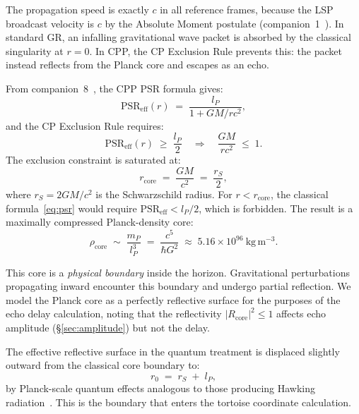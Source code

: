 \documentclass[12pt]{article}
\newcommand{\lP}{l_P}
\newcommand{\mP}{m_P}
\newcommand{\rS}{r_S}
\newcommand{\rcore}{r_{\mathrm{core}}}
\newcommand{\PSR}{\mathrm{PSR}}
\begin{document}
The propagation speed is exactly $c$ in all reference frames, because
the LSP broadcast velocity is $c$ by the Absolute Moment postulate
(companion~1~\cite{c1}).  In standard GR, an infalling gravitational
wave packet is absorbed by the classical singularity at $r = 0$.
In CPP, the CP Exclusion Rule prevents this: the packet instead
reflects from the Planck core and escapes as an echo.



From companion~8~\cite{c8}, the CPP PSR formula gives:
\begin{equation}
  \PSR_{\mathrm{eff}}(r) \;=\; \frac{\lP}{1 + GM/rc^2},
  \label{eq:psr}
\end{equation}
and the CP Exclusion Rule requires:
\begin{equation}
  \PSR_{\mathrm{eff}}(r) \;\geq\; \frac{\lP}{2}
  \quad \Longrightarrow \quad
  \frac{GM}{rc^2} \;\leq\; 1.
  \label{eq:exclusion}
\end{equation}
The exclusion constraint is saturated at:
\begin{equation}
  \rcore \;=\; \frac{GM}{c^2} \;=\; \frac{\rS}{2},
  \label{eq:rcore}
\end{equation}
where $\rS = 2GM/c^2$ is the Schwarzschild radius.  For $r < \rcore$,
the classical formula~\eqref{eq:psr} would require
$\PSR_{\mathrm{eff}} < \lP/2$, which is forbidden.  The result is a
maximally compressed Planck-density core:
\begin{equation}
  \rho_{\mathrm{core}} \;\sim\; \frac{\mP}{\lP^3}
  \;=\; \frac{c^5}{\hbar G^2}
  \;\approx\; 5.16\times 10^{96}\ \mathrm{kg\,m^{-3}}.
  \label{eq:rho_core}
\end{equation}

This core is a \emph{physical boundary} inside the horizon.  Gravitational
perturbations propagating inward encounter this boundary and undergo partial
reflection.  We model the Planck core as a perfectly reflective surface
for the purposes of the echo delay calculation, noting that the reflectivity
$|R_{\mathrm{core}}|^2 \leq 1$ affects echo amplitude (§\ref{sec:amplitude})
but not the delay.

The effective reflective surface in the quantum treatment is displaced
slightly outward from the classical core boundary to:
\begin{equation}
  r_0 \;=\; \rS \;+\; \lP,
  \label{eq:r0}
\end{equation}
by Planck-scale quantum effects analogous to those producing Hawking
radiation~\cite{hawking1975}.  This is the boundary that enters the tortoise
coordinate calculation.
\end{document}
